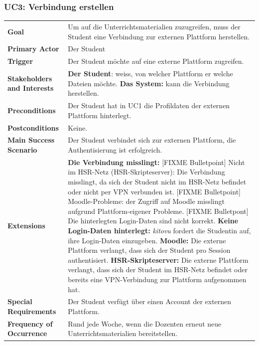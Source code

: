 \documentclass[a4paper]{article}
\begin{document}
\subsubsection{UC3: Verbindung erstellen}
\begin{tabulary}{\linewidth}{lp{30em}}
	\textbf{Goal} & Um auf die Unterrichtsmaterialien zuzugreifen, muss der Student eine Verbindung zur externen Plattform herstellen. \\
	\textbf{Primary Actor} & Der Student \\
	\textbf{Trigger} & Der Student möchte auf eine externe Plattform zugreifen. \\
	\textbf{Stakeholders and Interests} & \textbf{Der Student}: weiss, von welcher Plattform er welche Dateien möchte. \textbf{Das System:} kann die Verbindung herstellen. \\
	\textbf{Preconditions} & Der Student hat in UC1 die Profildaten der externen Plattform hinterlegt.\\
	\textbf{Postconditions} & Keine.\\
	\textbf{Main Success Scenario} & Der Student verbindet sich zur externen Plattform, die Authentisierung ist erfolgreich. \\
	\textbf{Extensions} & \textbf{Die Verbindung misslingt:} [FIXME Bulletpoint] Nicht im HSR-Netz (HSR-Skripteserver): Die Verbindung misslingt, da sich der Student nicht im HSR-Netz befindet oder nicht per VPN verbunden ist. [FIXME Bulletpoint] Moodle-Probleme: der Zugriff auf Moodle misslingt aufgrund Plattform-eigener Probleme. [FIXME Bulletpont] Die hinterlegten Login-Daten sind nicht korrekt.
	\textbf{Keine Login-Daten hinterlegt:} \emph{kitovu} fordert die Studentin auf, ihre Login-Daten einzugeben.
	\textbf{Moodle:} Die externe Plattform verlangt, dass sich der Student pro Session authentisiert. \textbf{HSR-Skripteserver:} Die externe Plattform verlangt, dass sich der Student im HSR-Netz befindet oder bereits eine VPN-Verbindung zur Plattform aufgenommen hat.\\
	\textbf{Special Requirements} & Der Student verfügt über einen Account der externen Plattform.\\
	\textbf{Frequency of Occurrence} & Rund jede Woche, wenn die Dozenten erneut neue Unterrichtsmaterialien bereitstellen. \\
\end{tabulary}
\end{document}
